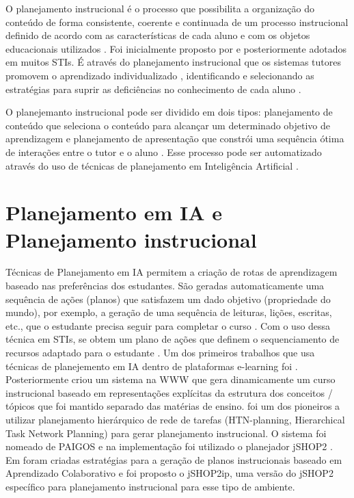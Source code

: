 \documentclass[
12pt,				%
oneside,			%
a4paper,			%
english,			%
brazil				%
]{abntex2ppgsi}
\begin{document}
O planejamento instrucional é o processo que possibilita a organização do conteúdo de forma consistente, coerente e continuada de um processo instrucional definido de acordo com as características de cada aluno e com os objetos educacionais utilizados \cite{vassileva1996, mohan2003}. Foi inicialmente proposto por \cite{peachey1986} e posteriormente adotados em muitos STIs. É através do planejamento instrucional que os sistemas tutores promovem o aprendizado individualizado \cite{mohan2003}, identificando e selecionando as estratégias para suprir as deficiências no conhecimento de cada aluno \cite{polson2013}.

O planejemanto instrucional pode ser dividido em dois tipos: planejamento de conteúdo que seleciona o conteúdo para alcançar um determinado objetivo de aprendizagem \cite{vassileva1996} e planejamento de apresentação que constrói uma sequência ótima de interações entre o tutor e o aluno \cite{mohan2003}. Esse processo pode ser automatizado através do uso de técnicas de planejamento em Inteligência Artificial \cite{cho2000, vassileva1996, brusilovsky2003, garrido2008}.

\section{Planejamento em IA e Planejamento instrucional}

Técnicas de Planejamento em IA permitem a criação de rotas de aprendizagem baseado nas preferências dos estudantes. São geradas automaticamente uma sequência de ações (planos) que satisfazem um dado objetivo (propriedade do mundo), por exemplo, a geração de uma sequência de leituras, lições, escritas, etc., que o estudante precisa seguir para completar o curso \cite{castillo2010}. Com o uso dessa técnica em STIs, se obtem um plano de ações que definem o sequenciamento de recursos adaptado para o estudante \cite{challco2012}.
Um dos primeiros trabalhos que usa técnicas de planejemento em IA dentro de plataformas e-learning foi \cite{peachey1986}. Posteriormente  criou um sistema na WWW que gera dinamicamente um curso instrucional baseado em representações explícitas da estrutura dos conceitos / tópicos que foi mantido separado das matérias de ensino.  foi um dos pioneiros a utilizar planejamento hierárquico de rede de tarefas (HTN-planning, Hierarchical Task Network Planning) para gerar planejamento instrucional. O sistema foi nomeado de PAIGOS e na implementação foi utilizado o planejador jSHOP2 \cite{nau2003}. Em  foram criadas estratégias para a geração de planos instrucionais baseado em Aprendizado Colaborativo e foi proposto o jSHOP2ip, uma versão do jSHOP2 específico para planejamento instrucional para esse tipo de ambiente.
\end{document}
